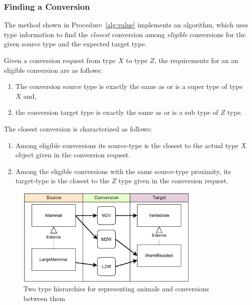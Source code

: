 \subsubsection{Finding a Conversion}
\label{sec:adapter:find}
The  method shown in Procedure~\ref{alg:value} implements an algorithm, which uses type information to find the \emph{closest} conversion among \emph{eligible} conversions for the given source type and the expected target type. 

Given a conversion request from type $X$ to type $Z$, the requirements for an an eligible conversion are as follows:
\begin{enumerate}[{E}-1]
\item The conversion source type is exactly the same as or is a super type of type $X$ and,
\item the conversion target type is exactly the same as or is a sub type of $Z$ type.
\end{enumerate}

The closest conversion is characterized as follows:
\begin{enumerate}[{C}-1]
\item Among eligible conversions its source-type is the closest to the actual type $X$ object given in the conversion request. 
\item Among the eligible conversions with the same source-type proximity, its target-type is the closest to the $Z$ type given in the conversion request.
\end{enumerate}



\begin{figure}[h]
\centering
\includegraphics[width=0.8\textwidth]{chapteradapters/animals.pdf}
\caption{Two type hierarchies for representing animals and conversions between them}
\label{fig:animals}
\end{figure}


